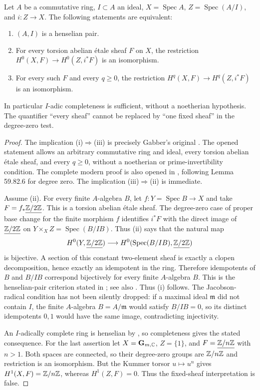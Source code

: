 \begin{theorem}\label{thm:B3-21}
Let $A$ be a commutative ring, $I\subset A$ an ideal,
$X=\operatorname{Spec}A$, $Z=\operatorname{Spec}(A/I)$, and $i:Z\to X$.
The following statements are equivalent:
\begin{enumerate}[label=(\roman*)]
\item $(A,I)$ is a henselian pair.
\item For every torsion abelian \'etale sheaf $F$ on $X$, the restriction
$H^0(X,F)\to H^0(Z,i^*F)$ is an isomorphism.
\item For every such $F$ and every $q\ge0$, the restriction
$H^q(X,F)\to H^q(Z,i^*F)$ is an isomorphism.
\end{enumerate}
In particular $I$-adic completeness is sufficient, without a noetherian
hypothesis. The quantifier ``every sheaf'' cannot be replaced by ``one
fixed sheaf'' in the degree-zero test.
\end{theorem}
\begin{proof}
The implication (i)$\Rightarrow$(iii) is precisely Gabber's original
\cite[Theorem 1, p.~326, with the definition on p.~325]{BGabber1994}.
The opened statement allows an arbitrary commutative ring and ideal,
every torsion abelian \'etale sheaf, and every $q\ge0$, without a
noetherian or prime-invertibility condition. The complete modern proof
is also opened in \cite[Theorem 59.82.7, tag 09ZI]{BStacks}, following
Lemma 59.82.6 for degree zero. The implication
(iii)$\Rightarrow$(ii) is immediate.

Assume (ii). For every finite $A$-algebra $B$, let
$f:Y=\operatorname{Spec}B\to X$ and take
$F=f_*\underline{{\mathbb{Z}}/2{\mathbb{Z}}}$. This is a torsion abelian \'etale sheaf.
The degree-zero case of proper base change for the finite morphism $f$
identifies $i^*F$ with the direct image of
$\underline{{\mathbb{Z}}/2{\mathbb{Z}}}$ on
$Y\times_X Z=\operatorname{Spec}(B/IB)$.
Thus (ii) says that the natural map
\[
 H^0(Y,\underline{{\mathbb{Z}}/2{\mathbb{Z}}})\longrightarrow
 H^0(\operatorname{Spec}(B/IB),\underline{{\mathbb{Z}}/2{\mathbb{Z}}})
\]
is bijective. A section of this constant two-element sheaf is exactly
a clopen decomposition, hence exactly an idempotent in the ring.
Therefore idempotents of $B$ and $B/IB$ correspond bijectively for every
finite $A$-algebra $B$. This is the henselian-pair criterion stated in
\cite[p.~325, condition (b)]{BGabber1994}; see also
\cite[Lemma 15.11.6, tag 09XI]{BStacks}. Thus (i) follows.
The Jacobson-radical condition has not been silently dropped:
if a maximal ideal $\mathfrak m$ did not contain $I$, the finite
$A$-algebra $B=A/\mathfrak m$ would satisfy $B/IB=0$, so its distinct
idempotents $0,1$ would have the same image, contradicting injectivity.

An $I$-adically complete ring is henselian by
\cite[Lemma 15.11.4, tag 0ALJ]{BStacks}, so completeness gives the
stated consequence. For the last assertion let
$X=\mathbf G_{m,{\mathbb{C}}}$, $Z=\{1\}$, and $F=\underline{{\mathbb{Z}}/n{\mathbb{Z}}}$ with
$n>1$. Both spaces are connected, so their degree-zero groups are
${\mathbb{Z}}/n{\mathbb{Z}}$ and restriction is an isomorphism. But the Kummer torsor
$u\mapsto u^n$ gives
$H^1(X,F)={\mathbb{Z}}/n{\mathbb{Z}}$, whereas $H^1(Z,F)=0$.
Thus the fixed-sheaf interpretation is false.
\end{proof}

